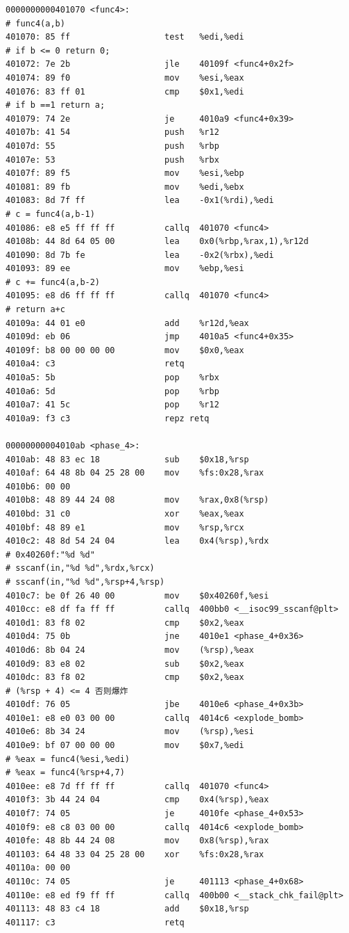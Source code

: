 \begin{lstlisting}
0000000000401070 <func4>:
# func4(a,b)
401070:	85 ff                	test   %edi,%edi
# if b <= 0 return 0;
401072:	7e 2b                	jle    40109f <func4+0x2f>
401074:	89 f0                	mov    %esi,%eax
401076:	83 ff 01             	cmp    $0x1,%edi
# if b ==1 return a;
401079:	74 2e                	je     4010a9 <func4+0x39>
40107b:	41 54                	push   %r12
40107d:	55                   	push   %rbp
40107e:	53                   	push   %rbx
40107f:	89 f5                	mov    %esi,%ebp
401081:	89 fb                	mov    %edi,%ebx
401083:	8d 7f ff             	lea    -0x1(%rdi),%edi
# c = func4(a,b-1)
401086:	e8 e5 ff ff ff       	callq  401070 <func4>
40108b:	44 8d 64 05 00       	lea    0x0(%rbp,%rax,1),%r12d
401090:	8d 7b fe             	lea    -0x2(%rbx),%edi
401093:	89 ee                	mov    %ebp,%esi
# c += func4(a,b-2)
401095:	e8 d6 ff ff ff       	callq  401070 <func4>
# return a+c
40109a:	44 01 e0             	add    %r12d,%eax
40109d:	eb 06                	jmp    4010a5 <func4+0x35>
40109f:	b8 00 00 00 00       	mov    $0x0,%eax
4010a4:	c3                   	retq   
4010a5:	5b                   	pop    %rbx
4010a6:	5d                   	pop    %rbp
4010a7:	41 5c                	pop    %r12
4010a9:	f3 c3                	repz retq 

00000000004010ab <phase_4>:
4010ab:	48 83 ec 18          	sub    $0x18,%rsp
4010af:	64 48 8b 04 25 28 00 	mov    %fs:0x28,%rax
4010b6:	00 00 
4010b8:	48 89 44 24 08       	mov    %rax,0x8(%rsp)
4010bd:	31 c0                	xor    %eax,%eax
4010bf:	48 89 e1             	mov    %rsp,%rcx
4010c2:	48 8d 54 24 04       	lea    0x4(%rsp),%rdx
# 0x40260f:"%d %d"
# sscanf(in,"%d %d",%rdx,%rcx)
# sscanf(in,"%d %d",%rsp+4,%rsp)
4010c7:	be 0f 26 40 00       	mov    $0x40260f,%esi
4010cc:	e8 df fa ff ff       	callq  400bb0 <__isoc99_sscanf@plt>
4010d1:	83 f8 02             	cmp    $0x2,%eax
4010d4:	75 0b                	jne    4010e1 <phase_4+0x36>
4010d6:	8b 04 24             	mov    (%rsp),%eax
4010d9:	83 e8 02             	sub    $0x2,%eax
4010dc:	83 f8 02             	cmp    $0x2,%eax
# (%rsp + 4) <= 4 否则爆炸
4010df:	76 05                	jbe    4010e6 <phase_4+0x3b>
4010e1:	e8 e0 03 00 00       	callq  4014c6 <explode_bomb>
4010e6:	8b 34 24             	mov    (%rsp),%esi
4010e9:	bf 07 00 00 00       	mov    $0x7,%edi
# %eax = func4(%esi,%edi)
# %eax = func4(%rsp+4,7)
4010ee:	e8 7d ff ff ff       	callq  401070 <func4>
4010f3:	3b 44 24 04          	cmp    0x4(%rsp),%eax
4010f7:	74 05                	je     4010fe <phase_4+0x53>
4010f9:	e8 c8 03 00 00       	callq  4014c6 <explode_bomb>
4010fe:	48 8b 44 24 08       	mov    0x8(%rsp),%rax
401103:	64 48 33 04 25 28 00 	xor    %fs:0x28,%rax
40110a:	00 00 
40110c:	74 05                	je     401113 <phase_4+0x68>
40110e:	e8 ed f9 ff ff       	callq  400b00 <__stack_chk_fail@plt>
401113:	48 83 c4 18          	add    $0x18,%rsp
401117:	c3                   	retq   
\end{lstlisting}

